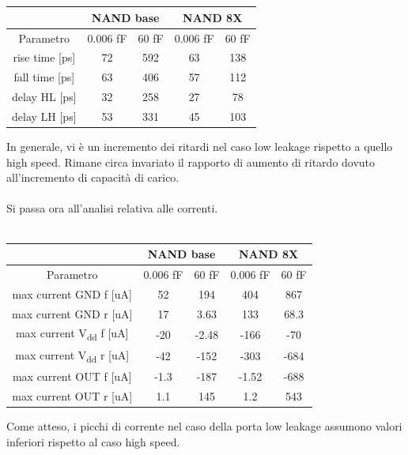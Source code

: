 \documentclass[11pt,  english, makeidx, a4paper, titlepage, oneside]{book}
\begin{document}
\\\\
\begin{center}
	\begin{tabular}{|c|c|c||c|c|}
	\hline
	& \multicolumn{2}{|c||}{NAND base} & \multicolumn{2}{|c|}{NAND 8X}\\
	\hline
	Parametro & 0.006 fF & 60 fF & 0.006 fF & 60 fF \\
	\hline
	rise time [ps] & 72 & 592 & 63 & 138\\
	\hline
	 fall time [ps] & 63 & 406 & 57 & 112 \\
	\hline
	delay HL [ps] & 32 & 258 & 27 & 78  \\
	\hline
	delay LH [ps] & 53 & 331 & 45 & 103 \\
	\hline
	\end{tabular}	
\end{center}
\vspace{0.3cm}
In generale, vi è un incremento dei ritardi nel caso low leakage rispetto a quello high speed. Rimane circa invariato il rapporto di aumento di ritardo dovuto all'incremento di capacità di carico.
\\\\
Si passa ora all'analisi relativa alle correnti.
\\\\
\begin{center}
	\begin{tabular}{|c|c|c||c|c|}
	\hline
	& \multicolumn{2}{|c||}{NAND base} & \multicolumn{2}{|c|}{NAND 8X}\\
	\hline
	Parametro & 0.006 fF & 60 fF & 0.006 fF & 60 fF \\
	\hline
	max current GND f [uA] & 52 & 194 & 404 & 867 \\
	\hline
	max current GND r [uA] & 17 & 3.63 & 133 & 68.3 \\
	\hline
	max current V\textsubscript{dd} f [uA] & -20 & -2.48 & -166 & -70 \\
	\hline
	max current V\textsubscript{dd} r [uA] & -42 & -152 & -303 & -684  \\
	\hline
	max current OUT f [uA] & -1.3 & -187 & -1.52 & -688 \\
	\hline
	max current OUT r [uA] & 1.1 & 145 & 1.2 & 543 \\
	\hline
	\end{tabular}	
\end{center}
\vspace{0.3cm}
Come atteso, i picchi di corrente nel caso della porta low leakage assumono valori inferiori rispetto al caso high speed.
\end{document}
